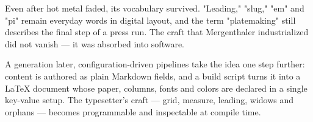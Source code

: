 \documentclass{linotype}
\begin{document}
\begin{plate}
\begin{storycolumns}
Even after hot metal faded, its vocabulary survived. "Leading," "slug," "em" and "pi" remain everyday words in digital layout, and the term "platemaking" still describes the final step of a press run. The craft that Mergenthaler industrialized did not vanish — it was absorbed into software.

A generation later, configuration-driven pipelines take the idea one step further: content is authored as plain Markdown fields, and a build script turns it into a LaTeX document whose paper, columns, fonts and colors are declared in a single key-value setup. The typesetter's craft — grid, measure, leading, widows and orphans — becomes programmable and inspectable at compile time.
\end{storycolumns}
\vspace{0.5mm}
\vspace{1mm}
\end{plate}
\newpage
\end{document}

